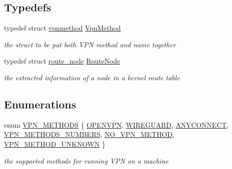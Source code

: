 \subsection*{Typedefs}
\begin{DoxyCompactItemize}
\item 
typedef struct \hyperlink{structvpnmethod}{vpnmethod} \hyperlink{route-tree_8h_a1034dd038389279bf422489d4d99d43a}{Vpn\+Method}
\begin{DoxyCompactList}\small\item\em the struct to be put both V\+PN method and name together \end{DoxyCompactList}\item 
typedef struct \hyperlink{structroute__node}{route\+\_\+node} \hyperlink{route-tree_8h_a1296be44c6672a1adb94ba6dc416682c}{Route\+Node}
\begin{DoxyCompactList}\small\item\em the extracted information of a node in a kernel route table \end{DoxyCompactList}\end{DoxyCompactItemize}
\subsection*{Enumerations}
\begin{DoxyCompactItemize}
\item 
enum \hyperlink{route-tree_8h_a5b876670828c4e38106ba1c6d91024b7}{V\+P\+N\+\_\+\+M\+E\+T\+H\+O\+DS} \{ \newline
\hyperlink{route-tree_8h_a5b876670828c4e38106ba1c6d91024b7ab1ae185eb0d77c55896e16a13cc83fcd}{O\+P\+E\+N\+V\+PN}, 
\hyperlink{route-tree_8h_a5b876670828c4e38106ba1c6d91024b7a16a826749e7c59a1ac398c5fea811044}{W\+I\+R\+E\+G\+U\+A\+RD}, 
\hyperlink{route-tree_8h_a5b876670828c4e38106ba1c6d91024b7ac610d0f8eb941cb8d8a5a1e30f60ea1b}{A\+N\+Y\+C\+O\+N\+N\+E\+CT}, 
\hyperlink{route-tree_8h_a5b876670828c4e38106ba1c6d91024b7a12890d8b7f1c543c687d8d72ce33d749}{V\+P\+N\+\_\+\+M\+E\+T\+H\+O\+D\+S\+\_\+\+N\+U\+M\+B\+E\+RS}, 
\newline
\hyperlink{route-tree_8h_a5b876670828c4e38106ba1c6d91024b7a096310080aa42637b2920b2e9e78aacd}{N\+O\+\_\+\+V\+P\+N\+\_\+\+M\+E\+T\+H\+OD}, 
\hyperlink{route-tree_8h_a5b876670828c4e38106ba1c6d91024b7a7df79fc150333242d7a3df021b1b2206}{V\+P\+N\+\_\+\+M\+E\+T\+H\+O\+D\+\_\+\+U\+N\+K\+N\+O\+WN}
 \}\begin{DoxyCompactList}\small\item\em the supported methods for running V\+PN on a machine \end{DoxyCompactList}
\end{DoxyCompactItemize}
